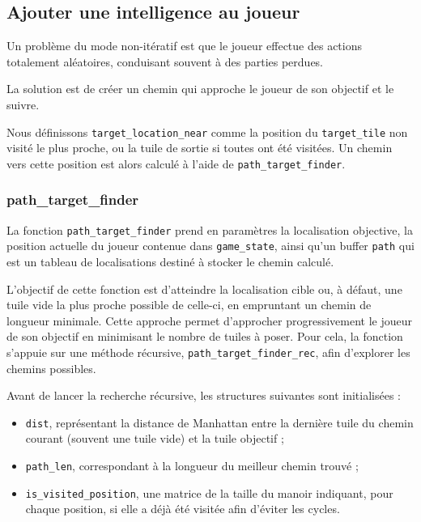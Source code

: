 \subsection{Ajouter une intelligence au joueur}

Un problème du mode non-itératif est que le joueur effectue des actions totalement aléatoires, conduisant souvent à des parties perdues.  

La solution est de créer un chemin qui approche le joueur de son objectif et le suivre.

Nous définissons \texttt{target\_location\_near} comme la position du \texttt{target\_tile} non visité le plus proche, ou la tuile de sortie si toutes ont été visitées. Un chemin vers cette position est alors calculé à l'aide de \texttt{path\_target\_finder}.

\subsubsection{path\_target\_finder}

La fonction \texttt{path\_target\_finder} prend en paramètres la localisation objective, la position actuelle du joueur contenue dans \texttt{game\_state}, ainsi qu’un buffer \texttt{path} qui est un tableau de localisations destiné à stocker le chemin calculé.

L’objectif de cette fonction est d’atteindre la localisation cible ou, à défaut, une tuile vide la plus proche possible de celle-ci, en empruntant un chemin de longueur minimale. Cette approche permet d’approcher progressivement le joueur de son objectif en minimisant le nombre de tuiles à poser. Pour cela, la fonction s’appuie sur une méthode récursive, \texttt{path\_target\_finder\_rec}, afin d’explorer les chemins possibles.

Avant de lancer la recherche récursive, les structures suivantes sont initialisées :
\begin{itemize}
  \item \texttt{dist}, représentant la distance de Manhattan entre la dernière tuile du chemin courant (souvent une tuile vide) et la tuile objectif ;
  \item \texttt{path\_len}, correspondant à la longueur du meilleur chemin trouvé ;
  \item \texttt{is\_visited\_position}, une matrice de la taille du manoir indiquant, pour chaque position, si elle a déjà été visitée afin d’éviter les cycles.
\end{itemize}

